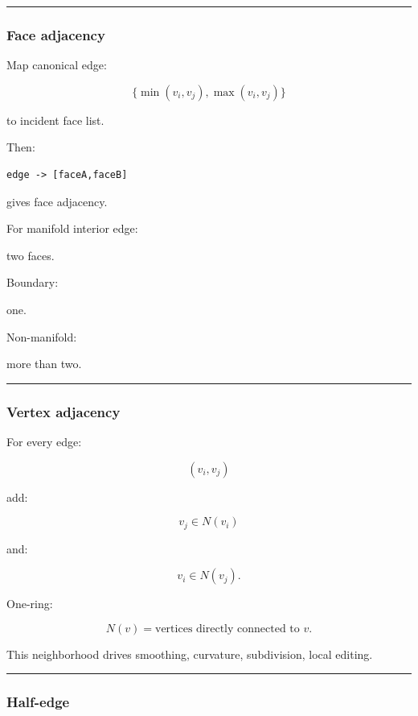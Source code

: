 \begin{center}\rule{0.5\linewidth}{0.5pt}\end{center}

\subsubsection{Face adjacency}\label{face-adjacency}

Map canonical edge:

\[
\{\min(v_i,v_j),\max(v_i,v_j)\}
\]

to incident face list.

Then:

\begin{verbatim}
edge -> [faceA,faceB]
\end{verbatim}

gives face adjacency.

For manifold interior edge:

two faces.

Boundary:

one.

Non-manifold:

more than two.

\begin{center}\rule{0.5\linewidth}{0.5pt}\end{center}

\subsubsection{Vertex adjacency}\label{vertex-adjacency}

For every edge:

\[
(v_i,v_j)
\]

add:

\[
v_j\in N(v_i)
\]

and:

\[
v_i\in N(v_j).
\]

One-ring:

\[
\boxed{
N(v)
=
\text{vertices directly connected to }v.
}
\]

This neighborhood drives smoothing, curvature, subdivision, local editing.

\begin{center}\rule{0.5\linewidth}{0.5pt}\end{center}

\subsubsection{Half-edge}\label{half-edge}

